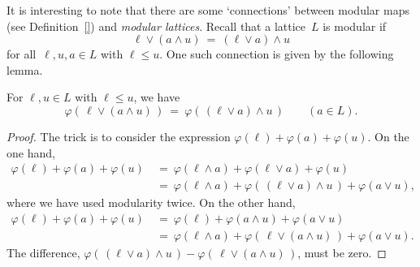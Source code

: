 \documentclass[main.tex]{subfiles}
\begin{document}
It is interesting to note that
there are some `connections'
between
modular maps (see Definition~\ref{})
and \emph{modular lattices}.
Recall that a lattice~$L$ is modular if
\begin{equation*}
\ell \vee (a \wedge u) \ =\ (\ell \vee a) \wedge u
\end{equation*}
for all~$\ell,u,a \in L$ with $\ell \leq u$.
One such connection is given by the following lemma.
%
%
\begin{lem}
\label{L:modular-map-modular}
For $\ell,u\in L$ with $\ell\leq u$, we have
\begin{equation}
\label{eq:modular-map}
\varphi(\,\ell \vee (a \wedge u)\,) 
\ =\ 
\varphi(\,(\ell\vee a)\wedge u\,)
\qquad (a\in L).
\end{equation}
\end{lem}
\begin{proof}
The trick is to consider the expression 
$\varphi(\ell) + \varphi(a) + \varphi(u)$.
On the one hand,
\begin{align*}
\varphi(\ell) + \varphi(a) + \varphi(u)
\ &=\ \varphi(\ell\wedge a) + \varphi(\ell \vee a) + \varphi(u) \\
\ &=\ \varphi(\ell \wedge a)
      + \varphi(\,(\ell\vee a)\wedge u\,)
      + \varphi(a\vee u),
\end{align*}
where we have used modularity twice.
On the other hand,
\begin{align*}
\varphi(\ell) + \varphi(a) + \varphi(u)
\ &=\ \varphi(\ell) + \varphi(a\wedge u) + \varphi(a \vee u) \\
\ &=\ \varphi(\ell \wedge a)
      + \varphi(\,\ell\vee (a\wedge u)\,)
      + \varphi(a\vee u).
\end{align*}
The difference,
$\varphi(\,(\ell\vee a)\wedge u\,)
- \varphi(\,\ell\vee (a\wedge u)\,)$,
must be zero.
\end{proof}

%
%
%
%
\end{document}
